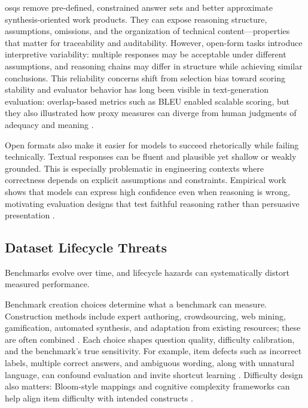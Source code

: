 \acp{osq} remove pre-defined, constrained answer sets and better approximate synthesis-oriented work products. They can expose reasoning structure, assumptions, omissions, and the organization of technical content—properties that matter for traceability and auditability. However, open-form tasks introduce interpretive variability: multiple responses may be acceptable under different assumptions, and reasoning chains may differ in structure while achieving similar conclusions. This reliability concerns shift from selection bias toward scoring stability and evaluator behavior has long been visible in text-generation evaluation: overlap-based metrics such as BLEU enabled scalable scoring, but they also illustrated how proxy measures can diverge from human judgments of adequacy and meaning \cite{papineniBleuMethodAutomatic2002}.

Open formats also make it easier for models to succeed rhetorically while failing technically. Textual responses can be fluent and plausible yet shallow or weakly grounded. This is especially problematic in engineering contexts where correctness depends on explicit assumptions and constraints. Empirical work shows that models can express high confidence even when reasoning is wrong, motivating evaluation designs that test faithful reasoning rather than persuasive presentation \cite{fu_mcq_reasoning_more_confident_when_wrong_2025, Sourav_Banerjee_2024_Vulnerability_LLM_Benchmarks}.





\subsection{Dataset Lifecycle Threats}
\label{subsec:ch2_dataset_threats}

Benchmarks evolve over time, and lifecycle hazards can systematically distort measured performance.

Benchmark creation choices determine what a benchmark can measure. Construction methods include expert authoring, crowdsourcing, web mining, gamification, automated synthesis, and adaptation from existing resources; these are often combined \cite{davisBenchmarksAutomatedCommonsense_2023}. 
Each choice shapes question quality, difficulty calibration, and the benchmark’s true sensitivity. For example, item defects such as incorrect labels, multiple correct answers, and ambiguous wording, along with unnatural language, can confound evaluation and invite shortcut learning \cite{davisBenchmarksAutomatedCommonsense_2023}. Difficulty design also matters: Bloom-style mappings and cognitive complexity frameworks can help align item difficulty with intended constructs \cite{blooms_taxonomy_1956, Liangtai_Sun_2023_SciEval_Benchmark, R_Sujay_2024_Question_Complexity_Estimation}.

